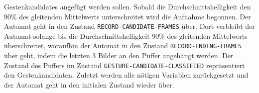 Gestenkandidates angefügt werden sollen. Sobald die Durchschnittshelligkeit den 90\% des gleitenden Mittelwerts unterschreitet wird die Aufnahme begonnen. Der Automat geht in den Zustand \texttt{RECORD-CANDIDATE-FRAMES}
über. Dort verbleibt der Automat solange bis die Durchschnittshelligkeit 90\% des gleitenden Mittelwerts überschreitet, woraufhin der Automat in den Zustand \texttt{RECORD-ENDING-FRAMES} über geht, indem die letzten 3
Bilder an den Puffer angehängt werden. Der Zustand des Puffers im Zustand \texttt{GESTURE-CANDIDATE-CLASSIFIED} repräsentiert den Gestenkandidaten. Zuletzt werden alle nötigen Variablen zurückgesetzt und der
Automat geht in den initialen Zustand wieder über.